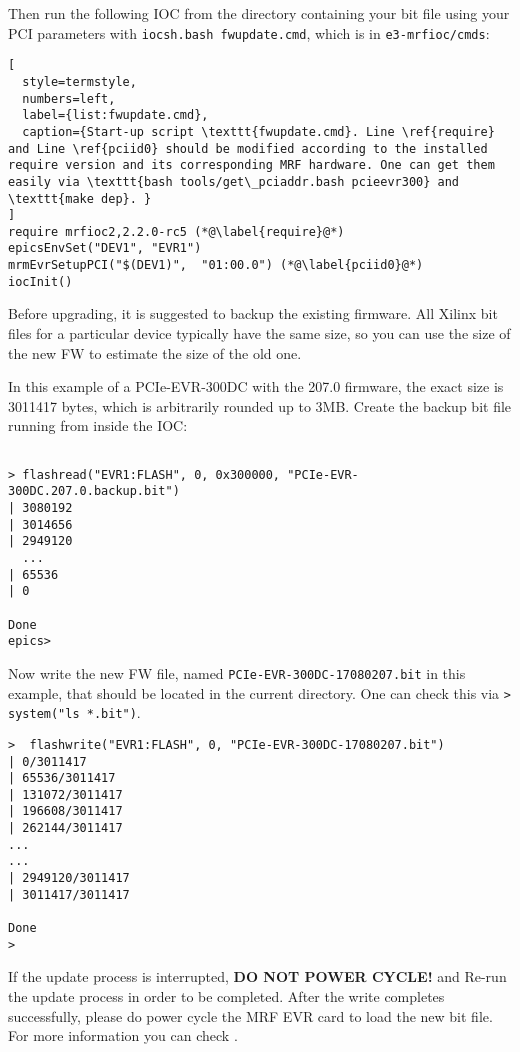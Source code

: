\documentclass[11pt
  , a4paper
  , article
  , oneside
  , showtrims
]{memoir}
\begin{document}
Then run the following IOC from the directory containing your bit file using your PCI parameters with \texttt{iocsh.bash fwupdate.cmd}, which is in \texttt{e3-mrfioc/cmds}:
\begin{lstlisting}[
  style=termstyle,
  numbers=left,
  label={list:fwupdate.cmd},
  caption={Start-up script \texttt{fwupdate.cmd}. Line \ref{require} and Line \ref{pciid0} should be modified according to the installed require version and its corresponding MRF hardware. One can get them easily via \texttt{bash tools/get\_pciaddr.bash pcieevr300} and \texttt{make dep}. }
]
require mrfioc2,2.2.0-rc5 (*@\label{require}@*)
epicsEnvSet("DEV1", "EVR1")
mrmEvrSetupPCI("$(DEV1)",  "01:00.0") (*@\label{pciid0}@*)
iocInit()
\end{lstlisting}

Before upgrading, it is suggested to backup the existing firmware. All Xilinx bit files for a particular device typically have the same size, so you can use the size of the new FW to estimate the size of the old one.

In this example of a PCIe-EVR-300DC with the 207.0 firmware, the exact size is 3011417 bytes, which is arbitrarily rounded up to 3MB. Create the backup bit file running from inside the IOC:
\begin{lstlisting}[style=termstyle]
  
> flashread("EVR1:FLASH", 0, 0x300000, "PCIe-EVR-300DC.207.0.backup.bit")
| 3080192
| 3014656
| 2949120
  ...
| 65536
| 0

Done
epics>
\end{lstlisting}

Now write the new FW file, named \texttt{PCIe-EVR-300DC-17080207.bit} in this example, that should be located in the current directory. One can check this via \texttt{> system("ls *.bit")}.

\begin{lstlisting}[style=termstyle]
>  flashwrite("EVR1:FLASH", 0, "PCIe-EVR-300DC-17080207.bit")
| 0/3011417
| 65536/3011417
| 131072/3011417
| 196608/3011417
| 262144/3011417
...
...
| 2949120/3011417
| 3011417/3011417

Done
>
\end{lstlisting}

If the update process is interrupted, \textbf{DO NOT POWER CYCLE!} and Re-run the update process in order to be completed. After the write completes successfully, please do power cycle the MRF EVR card to load the new bit file. For more information you can check \citep[section Firmware Update, PCIe-EVR-300DC, mTCA-EVR-300]{EVRUSAGEGUIDE}.
\end{document}
